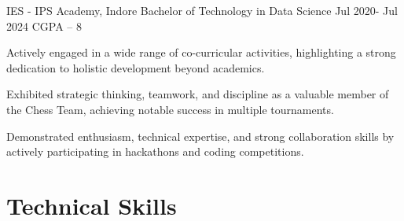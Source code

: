 \documentclass[letterpaper]{config}
\begin{document}
\EducationExperience
    {IES - IPS Academy, Indore} %
    {Bachelor of Technology in Data Science} %
    {Jul 2020- Jul 2024} %
    {CGPA – 8}
    {
        \item Actively engaged in a wide range of co-curricular activities, highlighting a strong dedication to holistic development beyond academics.
        \item Exhibited strategic thinking, teamwork, and discipline as a valuable member of the Chess Team, achieving notable success in multiple tournaments.
        \item Demonstrated enthusiasm, technical expertise, and strong collaboration skills by actively participating in hackathons and coding competitions.
    } 



    
\section{Technical Skills}

\end{document}
